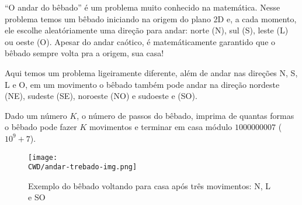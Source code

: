 %
“O andar do bêbado” é um problema muito conhecido na matemática. Nesse problema temos um bêbado iniciando na origem do plano 2D e, a cada momento, ele escolhe aleatóriamente uma direção para andar: norte (N), sul (S), leste (L) ou oeste (O). Apesar do andar caótico, é matemáticamente garantido que o bêbado sempre volta pra a origem, sua casa!

Aqui temos um problema ligeiramente diferente, além de andar nas direções N, S, L e O, em um movimento o bêbado também pode andar na direção nordeste (NE), sudeste (SE), noroeste (NO) e sudoeste e (SO). 

Dado um número $K$, o número de passos do bêbado, imprima de quantas formas o bêbado pode fazer $K$ movimentos e terminar em casa módulo $1000000007$ ($10^9 + 7$).

\begin{figure}[H]
    \centering
    \texttt{[image: \\CWD/andar-trebado-img.png]}
    \caption{Exemplo do bêbado voltando para casa após três movimentos: N, L e SO}
\end{figure}

%

%
%



\sampleio
